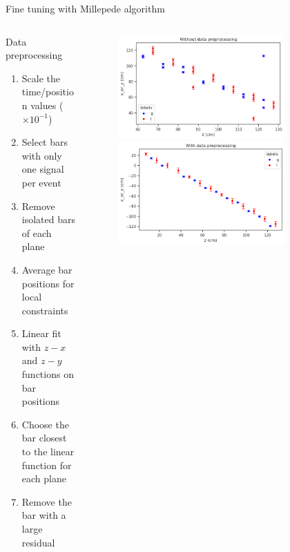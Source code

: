 \documentclass{ikpKoeln}
\begin{document}
\begin{frame}[t]{Fine tuning with Millepede algorithm}
	\vspace*{-1.2em}
	\begin{columns}[t]
		\begin{column}[t]{0.48 \textwidth}
			\begin{block}{Data preprocessing}
				\begin{enumerate}
					\item Scale the time/position values ($\times 10^{-1}$)
					\item Select bars with only one signal per event
					\item Remove isolated bars of each plane
					\item Average bar positions for local constraints
					\item Linear fit with $z-x$ and $z-y$ functions on bar positions
					\item Choose the bar closest to the linear function for each plane
					\item Remove the bar with a large residual
				\end{enumerate}
			\end{block}
		\end{column}
		\begin{column}[t]{0.48 \textwidth}
			\vspace*{-1em}
			\begin{figure}[t]
				\includegraphics[width = 0.8\textwidth]{R3BCon2024GSI/local_unfit.png}
				\includegraphics[width = 0.8\textwidth]{R3BCon2024GSI/local_fit.png}
			\end{figure}
		\end{column}
	\end{columns}
\end{frame}
\end{document}
